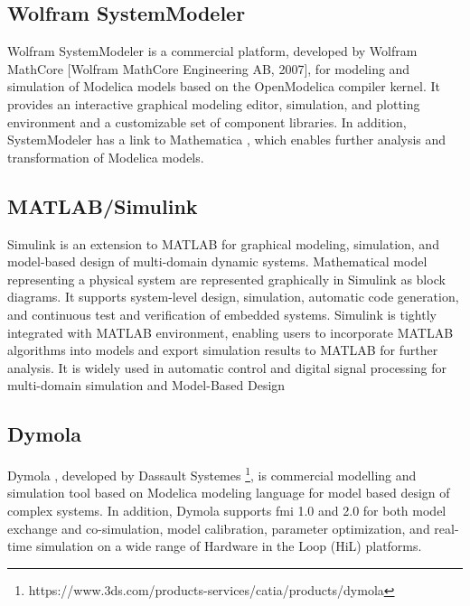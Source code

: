 \subsection{Wolfram SystemModeler}
\label{sec:wolfram}

Wolfram SystemModeler \cite{wolfram, wolframmats, wolframpeter} is a commercial platform, developed by Wolfram MathCore [Wolfram MathCore Engineering AB, 2007], for modeling and simulation of Modelica models based on the OpenModelica compiler kernel. It provides an interactive graphical modeling editor, simulation, and plotting environment and a customizable set of component libraries. In addition, SystemModeler has a link to Mathematica \cite{mathematica}, which enables further analysis and transformation of Modelica models.

\subsection{MATLAB/Simulink}
\label{sec:simulink}

Simulink \cite{simulink} is an extension to MATLAB for graphical modeling, simulation, and model-based design of multi-domain dynamic systems. Mathematical model representing a physical system are represented graphically in Simulink as block diagrams. It supports system-level design, simulation, automatic code generation, and continuous test and verification of embedded systems.
Simulink is tightly integrated with MATLAB environment, enabling users to incorporate MATLAB algorithms into models and export simulation results to MATLAB for further analysis. It is widely used in automatic control and digital signal processing for multi-domain simulation and Model-Based Design \cite{simulinkchristian,simulinkreedy}


\subsection{Dymola}
\label{sec:dymola}

Dymola \cite{dymola,dymoladag}, developed by Dassault Systemes \footnote{https://www.3ds.com/products-services/catia/products/dymola}, is commercial modelling and simulation tool based on Modelica modeling language for model based design of complex systems. In addition, Dymola supports \acrshort{fmi} 1.0 and 2.0 for both model exchange and co-simulation, model calibration, parameter optimization, and real-time simulation on a wide range of Hardware in the Loop (HiL) platforms.

